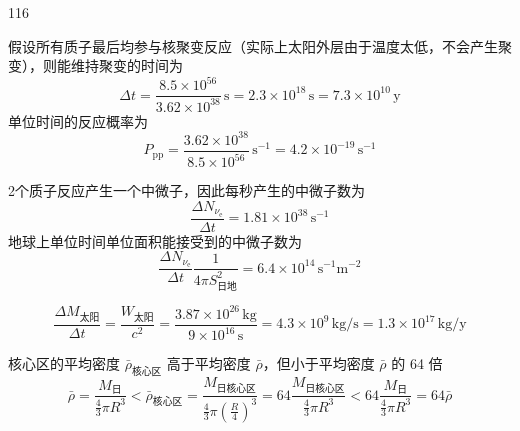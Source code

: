 \begin{solution}{116}
\begin{subsolution}
\begin{subsubsolution}
\begin{equation}
            \end{equation}
            假设所有质子最后均参与核聚变反应（实际上太阳外层由于温度太低，不会产生聚变），则能维持聚变的时间为
            \begin{equation}
                \Delta t = \frac{8.5 \times 10^{56}}{3.62 \times 10^{38}} \,\mathrm{s} = 2.3 \times 10^{18} \,\mathrm{s} = 7.3 \times 10^{10} \,\mathrm{y}
                \label{eq:22.s116}
            \end{equation}
            单位时间的反应概率为
            \begin{equation}
                P_{\mathrm{pp}} = \frac{3.62 \times 10^{38}}{8.5 \times 10^{56}} \,\mathrm{s^{-1}} = 4.2 \times 10^{-19} \,\mathrm{s^{-1}}
                \label{eq:23.s116}
            \end{equation}
        \end{subsubsolution}
        \begin{subsubsolution}
            2个质子反应产生一个中微子，因此每秒产生的中微子数为
            \begin{equation}
                \frac{\Delta N_{\nu_{\mathrm{e}}}}{\Delta t} = 1.81 \times 10^{38} \,\mathrm{s^{-1}}
            \end{equation}
            地球上单位时间单位面积能接受到的中微子数为
            \begin{equation}
                \frac{\Delta N_{\nu_{\mathrm{e}}}}{\Delta t} \frac{1}{4\pi S_{\text{日地}}^{2}} = 6.4 \times 10^{14} \,\mathrm{s^{-1} m^{-2}}
                \label{eq:24.s116}
            \end{equation}
        \end{subsubsolution}
        \begin{subsubsolution}
            \begin{equation}
                \frac{\Delta M_{\text{太阳}}}{\Delta t} = \frac{W_{\text{太阳}}}{c^{2}} = \frac{3.87 \times 10^{26} \,\mathrm{kg}}{9 \times 10^{16} \,\mathrm{s}} = 4.3 \times 10^{9} \,\mathrm{kg/s} = 1.3 \times 10^{17} \,\mathrm{kg/y}
                \label{eq:25.s116}
            \end{equation}
        \end{subsubsolution}
    \end{subsolution}
    \begin{subsolution}
        核心区的平均密度 $\bar{\rho}_{\text{核心区}}$ 高于平均密度 $\bar{\rho}$，但小于平均密度 $\bar{\rho}$ 的 64 倍
        \begin{equation}
            \bar{\rho} = \frac{M_{\text{日}}}{\frac{4}{3}\pi R^{3}} < \bar{\rho}_{\text{核心区}} = \frac{M_{\text{日核心区}}}{\frac{4}{3}\pi \left(\frac{R}{4}\right)^{3}} = 64 \frac{M_{\text{日核心区}}}{\frac{4}{3}\pi R^{3}} < 64 \frac{M_{\text{日}}}{\frac{4}{3}\pi R^{3}} = 64 \bar{\rho}

\end{equation}
\end{subsolution}
\end{solution}
